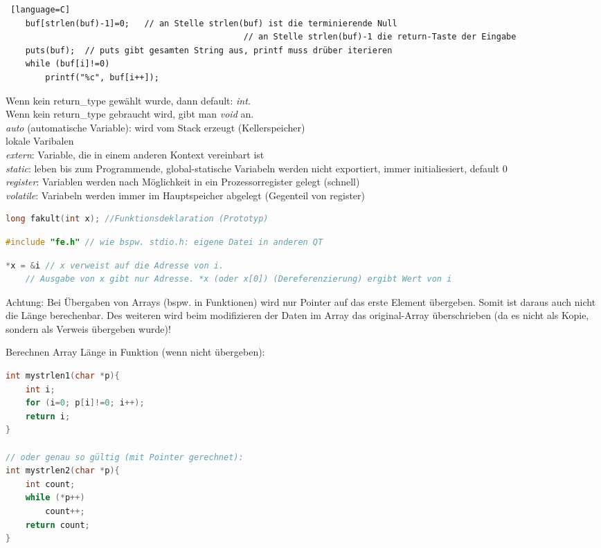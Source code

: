 \begin{multicols}{3}
\begin{lstlisting} [language=C]
	buf[strlen(buf)-1]=0;	// an Stelle strlen(buf) ist die terminierende Null
												// an Stelle strlen(buf)-1 die return-Taste der Eingabe
	puts(buf);	// puts gibt gesamten String aus, printf muss drüber iterieren
	while (buf[i]!=0)
		printf("%c", buf[i++]);
\end{lstlisting}
Wenn kein return\_type gewählt wurde, dann default: \emph{int}.\\
Wenn kein return\_type gebraucht wird, gibt man \emph{void} an.
\\
\emph{auto} (automatische Variable): wird vom Stack erzeugt (Kellerspeicher)\\
lokale Varibalen\\
\emph{extern}: Variable, die in einem anderen Kontext vereinbart ist\\
\emph{static}: leben bis zum Programmende, global-statische Variabeln werden nicht exportiert, immer initialiesiert, default 0\\
\emph{register}: Variablen werden nach Möglichkeit in ein Prozessorregister gelegt (schnell)\\
\emph{volatile}: Variabeln werden immer im Hauptspeicher abgelegt (Gegenteil von register)
\begin{lstlisting}[language=C]
long fakult(int x);	//Funktionsdeklaration (Prototyp)
\end{lstlisting}
\begin{lstlisting}[language=C]
#include "fe.h" // wie bspw. stdio.h: eigene Datei in anderen QT
\end{lstlisting}
\HRule[4pt]
\begin{lstlisting}[language=C]
	*x = &i // x verweist auf die Adresse von i. 
	// Ausgabe von x gibt nur Adresse. *x (oder x[0]) (Dereferenzierung) ergibt Wert von i
\end{lstlisting}
Achtung: Bei Übergaben von Arrays (bspw. in Funktionen) wird nur Pointer auf das erste Element übergeben. Somit ist daraus auch nicht die Länge berechenbar. Des weiteren wird beim modifizieren der Daten im Array das original-Array überschrieben (da es nicht als Kopie, sondern als Verweis übergeben wurde)!

Berechnen Array Länge in Funktion (wenn nicht übergeben):
\begin{lstlisting}[language=C]
int mystrlen1(char *p){
	int i;
	for (i=0; p[i]!=0; i++);
	return i;
}

// oder genau so gültig (mit Pointer gerechnet):
int mystrlen2(char *p){
	int count;
	while (*p++)
		count++;
	return count;
}
\end{lstlisting}


\end{multicols}
